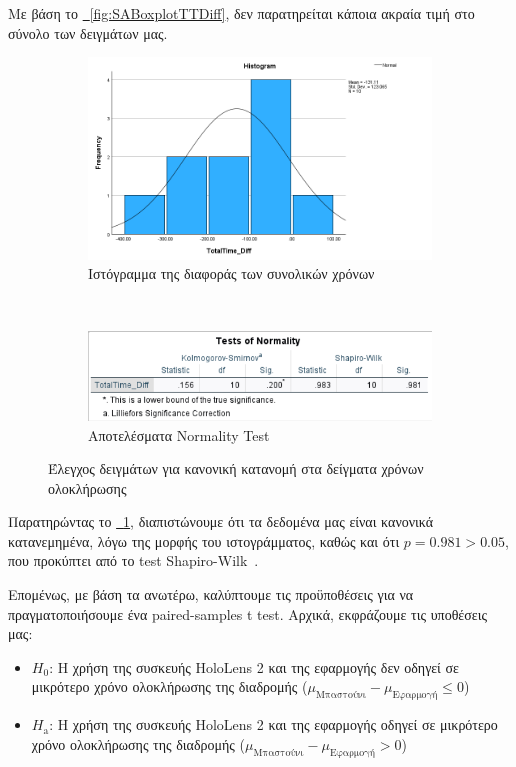 Με βάση το \hyperref[fig:SABoxplotTTDiff]{\schema~\ref*{fig:SABoxplotTTDiff}}, δεν παρατηρείται κάποια ακραία τιμή στο σύνολο των δειγμάτων μας.

\begin{figure}[!h]
    \centering
    \begin{subfigure}{0.8\textwidth}
        \centering
        \includegraphics[width=1\linewidth]{./images/SA_Histogram_TotalTimeDiff.png}
        \caption{Ιστόγραμμα της διαφοράς των συνολικών χρόνων}
    \end{subfigure}%
    \\
    \begin{subfigure}{0.8\textwidth}
        \centering
        \includegraphics[width=1\linewidth]{images/SA_NormalityTest_TotalTimeDiff.png}
        \caption{Αποτελέσματα Normality Test}
    \end{subfigure}%
    \caption{Έλεγχος δειγμάτων για κανονική κατανομή στα δείγματα χρόνων ολοκλήρωσης}\label{fig:SANormalDistribution}
\end{figure}

Παρατηρώντας το \hyperref[fig:SANormalDistribution]{\schema~\ref*{fig:SANormalDistribution}}, διαπιστώνουμε ότι τα δεδομένα μας είναι κανονικά κατανεμημένα, λόγω της μορφής του ιστογράμματος, καθώς και ότι $p = 0.981 > 0.05$, που προκύπτει από το test Shapiro-Wilk~\cite{shapiro_1965_an}.

Επομένως, με βάση τα ανωτέρω, καλύπτουμε τις προϋποθέσεις για να πραγματοποιήσουμε ένα paired-samples t test. Αρχικά, εκφράζουμε τις υποθέσεις μας:
\begin{itemize}
    \item \textbf{$H_0$}: Η χρήση της συσκευής HoloLens 2 και της εφαρμογής δεν οδηγεί σε μικρότερο χρόνο ολοκλήρωσης της διαδρομής ($\mu_{\text{Μπαστούνι}} - \mu_{\text{Εφαρμογή}} \le 0$)
    \item \textbf{$H_{\text{a}}$}: Η χρήση της συσκευής HoloLens 2 και της εφαρμογής οδηγεί σε μικρότερο χρόνο ολοκλήρωσης της διαδρομής ($\mu_{\text{Μπαστούνι}} - \mu_{\text{Εφαρμογή}} > 0$)
\end{itemize}

